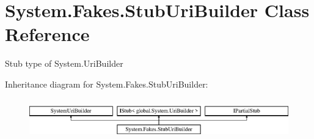 \hypertarget{class_system_1_1_fakes_1_1_stub_uri_builder}{\section{System.\-Fakes.\-Stub\-Uri\-Builder Class Reference}
\label{class_system_1_1_fakes_1_1_stub_uri_builder}
}


Stub type of System.\-Uri\-Builder 


Inheritance diagram for System.\-Fakes.\-Stub\-Uri\-Builder\-:\begin{figure}[H]
\begin{center}
\leavevmode
\includegraphics[height=1.777778cm]{class_system_1_1_fakes_1_1_stub_uri_builder}
\end{center}
\end{figure}
